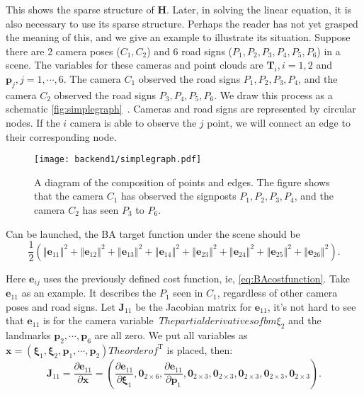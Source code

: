 This shows the sparse structure of $\bm{H}$. Later, in solving the linear equation, it is also necessary to use its sparse structure. Perhaps the reader has not yet grasped the meaning of this, and we give an example to illustrate its situation. Suppose there are 2 camera poses ($C_1, C_2$) and 6 road signs ($P_1, P_2, P_3, P_4, P_5, P_6$) in a scene. The variables for these cameras and point clouds are $\bm{T}_i, i = 1,2$ and $\bm{p}_j, j = 1,\cdots, 6$. The camera $C_1$ observed the road signs $P_1, P_2, P_3, P_4$, and the camera $C_2$ observed the road signs $P_3, P_4, P_5, P_6$. We draw this process as a schematic \autoref{fig:simplegraph}~. Cameras and road signs are represented by circular nodes. If the $i$ camera is able to observe the $j$ point, we will connect an edge to their corresponding node.

\begin{figure}[!htp]
\centering
\texttt{[image: backend1/simplegraph.pdf]}
\caption{A diagram of the composition of points and edges. The figure shows that the camera $C_1$ has observed the signposts $P_1, P_2, P_3, P_4$, and the camera $C_2$ has seen $P_3$ to $P_6$. }
\label{fig:simplegraph}
\end{figure}

Can be launched, the BA target function under the scene should be
\begin{equation}
\frac{1}{2}\left( \left\Vert \bm{e}_{11} \right\Vert^2 + 
\left\Vert \bm{e}_{12} \right\Vert^2 + 
\left\Vert \bm{e}_{13} \right\Vert^2 + 
\left\Vert \bm{e}_{14} \right\Vert^2 + 
\left\Vert \bm{e}_{23} \right\Vert^2 + 
\left\Vert \bm{e}_{24} \right\Vert^2 + 
\left\Vert \bm{e}_{25} \right\Vert^2 + 
\left\Vert \bm{e}_{26} \right\Vert^2 
\right).
\end{equation}

Here $\bm{e}_{ij}$ uses the previously defined cost function, ie, \eqref{eq:BAcostfunction}. Take $\bm{e}_{11}$ as an example. It describes the $P_1$ seen in $C_1$, regardless of other camera poses and road signs. Let $\bm{J}_{11}$ be the Jacobian matrix for $\bm{e}_{11}$, it’s not hard to see that $\bm{e}_{11}$ is for the camera variable $\ The partial derivatives of bm{\xi}_2$ and the landmarks $\bm{p}_2, \cdots, \bm{p}_6$ are all zero. We put all variables as $\bm{x} = \left( \bm{\xi}_1, \bm{\xi}_2, \bm{p}_1, \cdots, \bm{p}_2 \right) The order of ^\mathrm{T}$ is placed, then:
\begin{equation}
\bm{J}_{11} = \frac{\partial \bm{e}_{11}}{\partial \bm{x}}
= \left(
\frac{\partial \bm{e}_{11}}{\partial \bm{\xi}_1},
\bm{0}_{2\times 6},
\frac{\partial \bm{e}_{11}}{\partial \bm{p}_1},
\bm{0}_{2\times 3},
\bm{0}_{2\times 3},
\bm{0}_{2\times 3},
\bm{0}_{2\times 3},
\bm{0}_{2\times 3}
\right).
\end{equation}

